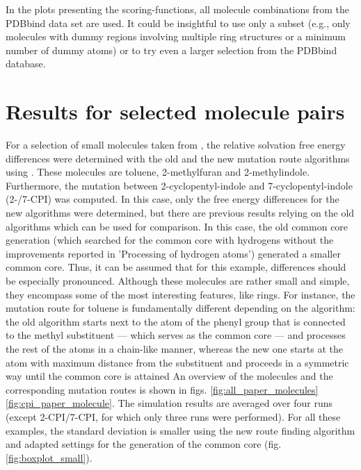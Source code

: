 In the plots presenting the scoring-functions, all molecule combinations
from the PDBbind data set are used. It could be insightful to use
only a subset (e.g., only molecules with dummy regions involving multiple
ring structures or a minimum number of dummy atoms) or to try even a larger selection from the PDBbind database.

\section{Results for selected molecule pairs}

For a selection of small molecules taken from \cite{Loeffler.2018, Wieder.2022}, the relative solvation free energy differences were determined with the old and the new mutation route algorithms  using {\trafo}. These molecules are toluene, 2-methylfuran and 2-methylindole.
Furthermore, the mutation between 2-cyclopentyl-indole and 7-cyclopentyl-indole (2-/7-CPI) was computed. In this case, only the free energy differences for the new algorithms were determined, but there are previous results relying on the old algorithms which can be used for comparison. In this case, the old common core generation (which searched for the common core with hydrogens without the improvements reported in 'Processing of hydrogen atoms') generated a smaller common core. Thus, it can be assumed that for this example, differences should be especially pronounced.
Although these molecules are rather small and simple, they encompass some of the most interesting features, like rings. For instance, the mutation route for toluene is fundamentally different depending on the algorithm: the old algorithm starts next to the atom of the phenyl group that is connected to the methyl substituent --- which serves as the common core --- and processes the rest of the atoms in a chain-like manner, whereas the new one starts at the atom with maximum distance from the substituent and proceeds in a symmetric way until the common core is attained
An overview of the molecules and the corresponding mutation routes is shown in figs. \ref{fig:all_paper_molecules}  \ref{fig:cpi_paper_molecule}.
The simulation results are averaged over four runs (except 2-CPI/7-CPI, for which only three runs were performed). 
For all these examples, the standard deviation is smaller using the new route finding algorithm and adapted settings for the generation of the common core (fig. \ref{fig:boxplot_small}).


